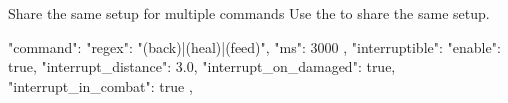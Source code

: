 \begin{example}{Share the same setup for multiple commands}
    Use the  to share the same setup.
    \begin{jsoncode}
    {
        "command": {
        "regex": "(back)|(heal)|(feed)",
        "ms": 3000
    },
        "interruptible": {
        "enable": true,
        "interrupt_distance": 3.0,
        "interrupt_on_damaged": true,
        "interrupt_in_combat": true
    }
    }
        ,
    \end{jsoncode}
\end{example}
